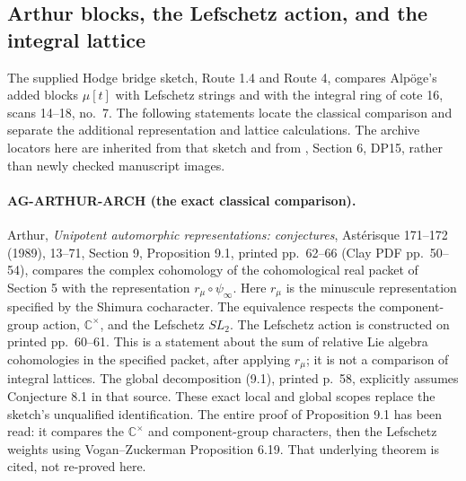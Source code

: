 \documentclass[11pt,a4paper]{article}
\begin{document}
\subsection{Arthur blocks, the Lefschetz action, and the integral lattice}
\label{ag:arthur}

The supplied Hodge bridge sketch, Route 1.4 and Route 4, compares
Alpöge's added blocks $\mu[t]$ with Lefschetz strings and with the
integral ring of cote 16, scans 14--18, no.~7. The following
statements locate the classical comparison and separate the
additional representation and lattice calculations. The archive
locators here are inherited from that sketch and from
, Section 6,
DP15, rather than newly checked manuscript images.

\paragraph{AG-ARTHUR-ARCH (the exact classical comparison).}
Arthur, \emph{Unipotent automorphic representations: conjectures},
Astérisque 171--172 (1989), 13--71, Section 9,
Proposition 9.1, printed pp.~62--66 (Clay PDF pp.~50--54),
compares the complex cohomology of the cohomological real packet
of Section 5 with the representation $r_\mu\circ\psi_\infty$.
Here $r_\mu$ is the minuscule representation specified by the
Shimura cocharacter. The equivalence respects the component-group
action, $\mathbb C^\times$, and the Lefschetz $SL_2$.
The Lefschetz action is constructed on printed pp.~60--61.
This is a statement about the sum of relative Lie algebra
cohomologies in the specified packet, after applying $r_\mu$;
it is not a comparison of integral lattices. The global
decomposition (9.1), printed p.~58, explicitly assumes
Conjecture 8.1 in that source. These exact local and global
scopes replace the sketch's unqualified identification.
The entire proof of Proposition 9.1 has been read: it compares
the $\mathbb C^\times$ and component-group characters, then the
Lefschetz weights using Vogan--Zuckerman Proposition 6.19.
That underlying theorem is cited, not re-proved here.
\end{document}
